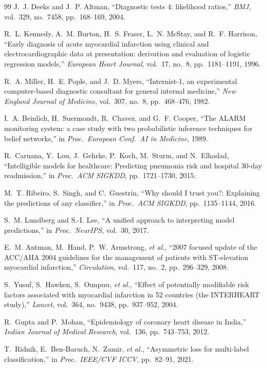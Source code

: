 \documentclass[journal]{IEEEtran}
\begin{document}
\begin{thebibliography}{99}
J.~J. Deeks and J.~P. Altman,
``Diagnostic tests 4: likelihood ratios,''
\textit{BMJ}, vol.~329, no.~7458, pp.~168--169, 2004.

R.~L. Kennedy, A.~M. Burton, H.~S. Fraser, L.~N. McStay,
and R.~F. Harrison,
``Early diagnosis of acute myocardial infarction using clinical and
electrocardiographic data at presentation: derivation and evaluation
of logistic regression models,''
\textit{European Heart Journal}, vol.~17, no.~8, pp.~1181--1191, 1996.

R.~A. Miller, H.~E. Pople, and J.~D. Myers,
``Internist-1, an experimental computer-based diagnostic consultant
for general internal medicine,''
\textit{New England Journal of Medicine}, vol.~307, no.~8,
pp.~468--476, 1982.

I.~A. Beinlich, H.~Suermondt, R.~Chavez, and G.~F. Cooper,
``The ALARM monitoring system: a case study with two probabilistic
inference techniques for belief networks,''
in \textit{Proc.\ European Conf.\ AI in Medicine}, 1989.

R.~Caruana, Y.~Lou, J.~Gehrke, P.~Koch, M.~Sturm, and N.~Elhadad,
``Intelligible models for healthcare: Predicting pneumonia risk and
hospital 30-day readmission,''
in \textit{Proc.\ ACM SIGKDD}, pp.~1721--1730, 2015.

M.~T. Ribeiro, S.~Singh, and C.~Guestrin,
``Why should I trust you?: Explaining the predictions of any
classifier,''
in \textit{Proc.\ ACM SIGKDD}, pp.~1135--1144, 2016.

S.~M. Lundberg and S.-I. Lee,
``A unified approach to interpreting model predictions,''
in \textit{Proc.\ NeurIPS}, vol.~30, 2017.

E.~M. Antman, M.~Hand, P.~W. Armstrong, \textit{et al.},
``2007 focused update of the ACC/AHA 2004 guidelines for the
management of patients with ST-elevation myocardial infarction,''
\textit{Circulation}, vol.~117, no.~2, pp.~296--329, 2008.

S.~Yusuf, S.~Hawken, S.~Ounpuu, \textit{et al.},
``Effect of potentially modifiable risk factors associated with
myocardial infarction in 52 countries (the INTERHEART study),''
\textit{Lancet}, vol.~364, no.~9438, pp.~937--952, 2004.

R.~Gupta and P.~Mohan,
``Epidemiology of coronary heart disease in India,''
\textit{Indian Journal of Medical Research},
vol.~136, pp.~743--753, 2012.

T.~Ridnik, E.~Ben-Baruch, N.~Zamir, \textit{et al.},
``Asymmetric loss for multi-label classification,''
in \textit{Proc.\ IEEE/CVF ICCV}, pp.~82--91, 2021.

\end{thebibliography}
\end{document}
